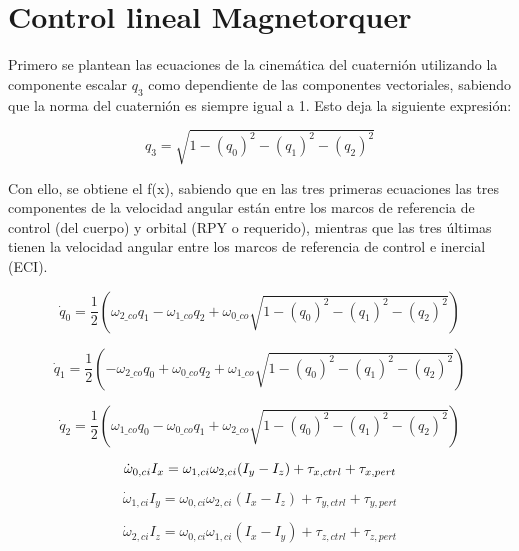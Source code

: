 \section{Control lineal Magnetorquer}
\label{ap:Z5}

Primero se plantean las ecuaciones de la cinemática del cuaternión utilizando la componente escalar \( q_3 \) como dependiente de las componentes vectoriales, sabiendo que la norma del cuaternión es siempre igual a 1. Esto deja la siguiente expresión:

\[
q_3 = \sqrt{1 - (q_0)^2 - (q_1)^2 - (q_2)^2}
\]

Con ello, se obtiene el f(x), sabiendo que en las tres primeras ecuaciones las tres componentes de la velocidad angular están entre los marcos de referencia de control (del cuerpo) y orbital (RPY o requerido), mientras que las tres últimas tienen la velocidad angular entre los marcos de referencia de control e inercial (ECI).

\begin{equation}
	\dot{q}_0 = \frac{1}{2} \left( \omega_{2\_co} q_1 - \omega_{1\_co} q_2 + \omega_{0\_co} \sqrt{1 - (q_0)^2 - (q_1)^2 - (q_2)^2} \right)
\end{equation}

\begin{equation}
	\dot{q}_1 = \frac{1}{2} \left( -\omega_{2\_co} q_0 + \omega_{0\_co} q_2 + \omega_{1\_co} \sqrt{1 - (q_0)^2 - (q_1)^2 - (q_2)^2} \right)
\end{equation}

\begin{equation}
	\dot{q}_2 = \frac{1}{2} \left( \omega_{1\_co} q_0 - \omega_{0\_co} q_1 + \omega_{2\_co} \sqrt{1 - (q_0)^2 - (q_1)^2 - (q_2)^2} \right)
\end{equation}

\begin{equation}
	\dot{\omega}_{0,ci} I_x = \omega_{1,ci} \omega_{2,ci} (I_y - I_z) + \tau_{x,ctrl} + \tau_{x,pert} \\
\end{equation}

\begin{equation}
	\dot{\omega}_{1,ci} I_y = \omega_{0,ci} \omega_{2,ci} (I_x - I_z) + \tau_{y,ctrl} + \tau_{y,pert}
\end{equation}

\begin{equation}
	\dot{\omega}_{2,ci} I_z = \omega_{0,ci} \omega_{1,ci} (I_x - I_y) + \tau_{z,ctrl} + \tau_{z,pert}
\end{equation}


